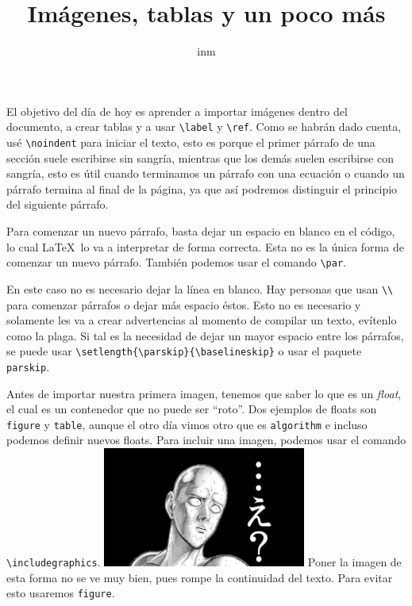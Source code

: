 \documentclass[a4paper,article,oneside,11pt]{memoir}
\title{Imágenes, tablas y un poco más}
\author{inm}
\begin{document}
\maketitle

\noindent El objetivo del día de hoy es aprender a importar imágenes dentro del documento, a crear tablas y a usar \verb|\label| y \verb|\ref|. Como se habrán dado cuenta, usé \verb|\noindent| para iniciar el texto, esto es porque el primer párrafo de una sección suele escribirse sin sangría, mientras que los demás suelen escribirse con sangría, esto es útil cuando terminamos un párrafo con una ecuación o cuando un párrafo termina al final de la página, ya que así podremos distinguir el principio del siguiente párrafo.

Para comenzar un nuevo párrafo, basta dejar un espacio en blanco en el código, lo cual \LaTeX\ lo va a interpretar de forma correcta. Esta no es la única forma de comenzar un nuevo párrafo. También podemos usar el comando \verb|\par|. \par
En este caso no es necesario dejar la línea en blanco. Hay personas que usan \verb|\\| para comenzar párrafos o dejar más espacio éstos. Esto no es necesario y solamente les va a crear advertencias al momento de compilar un texto, evítenlo como la plaga. Si tal es la necesidad de dejar un mayor espacio entre los párrafos, se puede usar \verb|\setlength{\parskip}{\baselineskip}| o usar el paquete \texttt{parskip}.

Antes de importar nuestra primera imagen, tenemos que saber lo que es un \emph{float}, el cual es un contenedor que no puede ser ``roto''. Dos ejemplos de floats son \verb|figure| y \verb|table|, aunque el otro día vimos otro que es \verb|algorithm| e incluso podemos definir nuevos floats. Para incluir una imagen, podemos usar el comando \verb|\includegraphics|. \includegraphics[width=0.5\textwidth]{images/huuuu.png} Poner la imagen de esta forma no se ve muy bien, pues rompe la continuidad del texto. Para evitar esto usaremos \verb|figure|.
\end{document}
